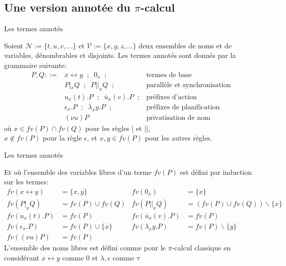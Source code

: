 \documentclass[11pt]{beamer}
\newcommand{\NN}{\ensuremath{\mathcal{N}}\xspace}
\newcommand{\VV}{\ensuremath{\mathcal{V}}\xspace}
\newcommand{\tto}{\leftrightarrow}
\begin{document}
\subsection{Une version annotée du $\pi$-calcul}

\begin{frame}{Les termes annotés}
\begin{definition}
Soient $\NN:=\{t,u,v,\ldots\}$ et $\VV:=\{x,y,z,\ldots\}$ deux ensembles de noms et de variables, dénombrables et disjoints. Les termes annotés sont donnés par la grammaire suivante:
\begin{align*}
P,Q::= & x\tto y\;\;;\;\;0_x\;\;; & \text{termes de base}\\
& P|_xQ\;\;;\;\;P||_xQ\;\;; & \text{parallèle et synchronisation}\\
& u_x(t).P\;\;;\;\;\bar{u}_x(v).P\;\;; & \text{préfixes d'action}\\
& \epsilon_x.P\;\;;\;\;\lambda_xy.P\;\;; & \text{préfixes de planification}\\
& (\nu u)P & \text{privatisation de nom}
\end{align*}
où $x\in fv(P)\cap fv(Q)$ pour les règles | et ||,\\
$x\not\in fv(P)$ pour la règle $\epsilon$, et $x,y\in fv(P)$ pour les autres règles.
\end{definition}
\end{frame}

\begin{frame}{Les termes annotés}
\begin{definition}
Et où l'ensemble des variables libres d'un terme $fv(P)$ est défini par induction sur les termes:
\begin{align*}
fv(x\tto y) &= \{x,y\} & fv(0_x) &= \{x\}\\
fv(P|_xQ) &= fv(P)\cup fv(Q) & fv(P||_xQ) &= (fv(P)\cup fv(Q))\backslash\{x\}\\
fv(u_x(t).P) &= fv(P) & fv(\bar{u}_x(v).P) &= fv(P) \\
fv(\epsilon_x.P) &= fv(P)\cup\{x\} & fv(\lambda_xy.P) &= fv(P)\backslash\{y\}\\
fv((\nu u)P) &= fv(P)
\end{align*}
L'ensemble des noms libres est défini comme pour le $\pi$-calcul classique en considérant $x\tto y$ comme 0 et $\lambda,\epsilon$ comme $\tau$
\end{definition}
\end{frame}
\end{document}
